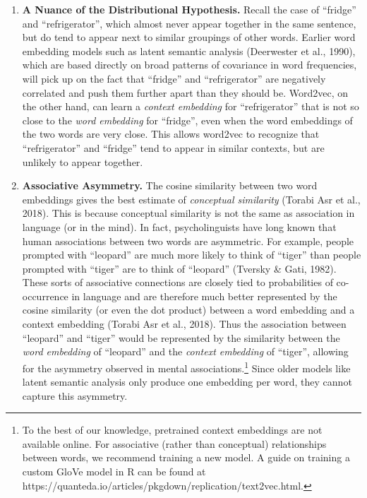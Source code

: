 \documentclass[
  man,
  floatsintext,
  longtable,
  nolmodern,
  notxfonts,
  notimes,
  colorlinks=true,linkcolor=blue,citecolor=blue,urlcolor=blue]{apa7}
\providecommand{\tightlist}{%
  \setlength{\itemsep}{0pt}\setlength{\parskip}{0pt}}
\begin{document}
\begin{enumerate}
\def\labelenumi{\arabic{enumi}.}
\tightlist
\item
  \textbf{A Nuance of the Distributional Hypothesis.} Recall the case of
  ``fridge'' and ``refrigerator'', which almost never appear together in
  the same sentence, but do tend to appear next to similar groupings of
  other words. Earlier word embedding models such as latent semantic
  analysis (Deerwester et al., 1990), which are based directly on broad
  patterns of covariance in word frequencies, will pick up on the fact
  that ``fridge'' and ``refrigerator'' are negatively correlated and
  push them further apart than they should be. Word2vec, on the other
  hand, can learn a \emph{context embedding} for ``refrigerator'' that
  is not so close to the \emph{word embedding} for ``fridge'', even when
  the word embeddings of the two words are very close. This allows
  word2vec to recognize that ``refrigerator'' and ``fridge'' tend to
  appear in similar contexts, but are unlikely to appear together.
\item
  \textbf{Associative Asymmetry.} The cosine similarity between two word
  embeddings gives the best estimate of \emph{conceptual similarity}
  (Torabi Asr et al., 2018). This is because conceptual similarity is
  not the same as association in language (or in the mind). In fact,
  psycholinguists have long known that human associations between two
  words are asymmetric. For example, people prompted with ``leopard''
  are much more likely to think of ``tiger'' than people prompted with
  ``tiger'' are to think of ``leopard'' (Tversky \& Gati, 1982). These
  sorts of associative connections are closely tied to probabilities of
  co-occurrence in language and are therefore much better represented by
  the cosine similarity (or even the dot product) between a word
  embedding and a context embedding (Torabi Asr et al., 2018). Thus the
  association between ``leopard'' and ``tiger'' would be represented by
  the similarity between the \emph{word embedding} of ``leopard'' and
  the \emph{context embedding} of ``tiger'', allowing for the asymmetry
  observed in mental associations.\footnote{To the best of our
    knowledge, pretrained context embeddings are not available online.
    For associative (rather than conceptual) relationships between
    words, we recommend training a new model. A guide on training a
    custom GloVe model in R can be found at
    https://quanteda.io/articles/pkgdown/replication/text2vec.html.}
  Since older models like latent semantic analysis only produce one
  embedding per word, they cannot capture this asymmetry.
\end{enumerate}
\end{document}
